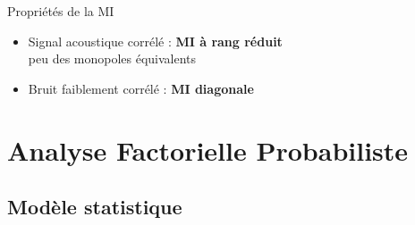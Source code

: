 \documentclass[10pt,xcolor=x11names,compress, show notes]{beamer}%
\begin{document}
\begin{frame}[t]{Propriétés de la MI}
	\begin{itemize}
		\setlength{\itemindent}{1cm}
		\item<3-> Signal \textcolor{source}{acoustique} corrélé : {\bfseries MI à rang réduit}\\ \centering peu des monopoles équivalents
		\item<3-> \textcolor{rouge}{Bruit} faiblement corrélé : {\bfseries MI diagonale}\\		
	\end{itemize}
\end{frame}


\section{Analyse Factorielle Probabiliste}
\subsection*{Modèle statistique}
\end{document}
